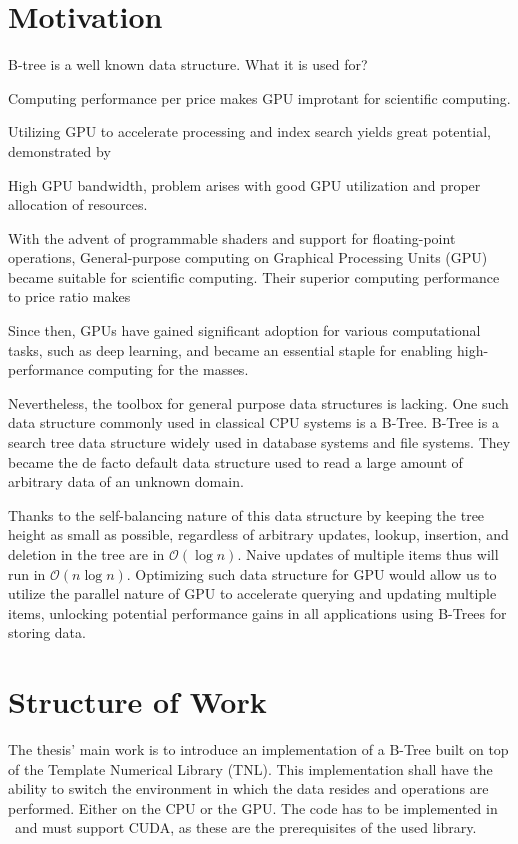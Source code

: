 \section{Motivation}

B-tree is a well known data structure. What it is used for?

Computing performance per price makes GPU improtant for scientific computing.

Utilizing GPU to accelerate processing and index search yields great potential, demonstrated by 

High GPU bandwidth, problem arises with good GPU utilization and proper allocation of resources.



With the advent of programmable shaders and support for floating-point operations, General-purpose computing on Graphical Processing Units (GPU) became suitable for scientific computing. Their superior computing performance to price ratio makes 

Since then, GPUs have gained significant adoption for various computational tasks, such as deep learning, and became an essential staple for enabling high-performance computing for the masses.

Nevertheless, the toolbox for general purpose data structures is lacking. One such data structure commonly used in classical CPU systems is a B-Tree. B-Tree is a search tree data structure widely used in database systems and file systems. They became the de facto default data structure used to read a large amount of arbitrary data of an unknown domain.

Thanks to the self-balancing nature of this data structure by keeping the tree height as small as possible, regardless of arbitrary updates, lookup, insertion, and deletion in the tree are in $\mathcal{O}(\log{n})$. Naive updates of multiple items thus will run in $\mathcal{O}(n \log{n})$. Optimizing such data structure for GPU would allow us to utilize the parallel nature of GPU to accelerate querying and updating multiple items, unlocking potential performance gains in all applications using B-Trees for storing data.

\section{Structure of Work}

The thesis' main work is to introduce an implementation of a B-Tree built on top of the Template Numerical Library (TNL). This implementation shall have the ability to switch the environment in which the data resides and operations are performed. Either on the CPU or the GPU. The code has to be implemented in \CC\ and must support CUDA, as these are the prerequisites of the used library.

